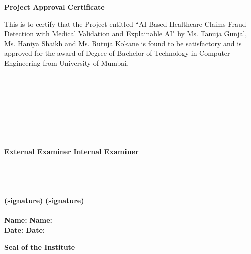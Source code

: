\newpage
\thispagestyle{empty}
\vspace*{0.2cm}
\vspace{1cm}
\begin{center}
 \large\textbf{Project Approval Certificate}
\end{center}
\vspace{2cm}
This is to certify that the Project entitled
``AI-Based Healthcare Claims Fraud Detection with Medical Validation and Explainable AI"
by Ms. Tanuja Gunjal, Ms. Haniya Shaikh and Ms. Rutuja Kokane
is found to be satisfactory and is approved for the award of Degree of
Bachelor of Technology in Computer Engineering from University of Mumbai.
\\
\\
\\
\\
\\
\\
\\
\\
\\
\textbf {External Examiner} \hspace{2.85in} \textbf{Internal Examiner}\\ 
\\
\\
\\
\\
\textbf {(signature)} \hspace{3.5in} \textbf{(signature)} \\
\\
\vspace{1cm}
\textbf {Name:} \hspace{3.8in} \textbf{Name:}\\ 
\vspace{2cm}
\textbf {Date:} \hspace{3.9in} \textbf{Date:}\\ 
\vspace{2cm}
\begin{center}
\textbf{Seal of the Institute}\\
\end{center}

